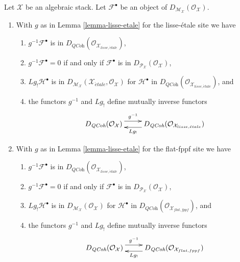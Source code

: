 \begin{lemma}
\label{lemma-derived-quasi-coherent}
Let $\mathcal{X}$ be an algebraic stack.
Let $\mathcal{F}^\bullet$ be an object of
$D_{\mathcal{M}_\mathcal{X}}(\mathcal{O}_\mathcal{X})$.
\begin{enumerate}
\item With $g$ as in Lemma \ref{lemma-lisse-etale}
for the lisse-\'etale site we have
\begin{enumerate}
\item $g^{-1}\mathcal{F}^\bullet$ is in
$D_{\textit{QCoh}}(\mathcal{O}_{\mathcal{X}_{lisse,\acute{e}tale}})$,
\item $g^{-1}\mathcal{F}^\bullet = 0$ if and only if
$\mathcal{F}^\bullet$ is in
$D_{\mathcal{P}_\mathcal{X}}(\mathcal{O}_\mathcal{X})$,
\item $Lg_!\mathcal{H}^\bullet$ is in
$D_{\mathcal{M}_\mathcal{X}}(
\mathcal{X}_{\acute{e}tale}, \mathcal{O}_\mathcal{X})$
for $\mathcal{H}^\bullet$ in
$D_{\textit{QCoh}}(\mathcal{O}_{\mathcal{X}_{lisse,\acute{e}tale}})$, and
\item the functors $g^{-1}$ and $Lg_!$ define mutually inverse functors
$$
\xymatrix{
D_{\textit{QCoh}}(\mathcal{O}_\mathcal{X}) \ar@<1ex>[r]^-{g^{-1}} &
D_{\textit{QCoh}}(\mathcal{O}_{\mathcal{X}_{lisse,\acute{e}tale}})
\ar@<1ex>[l]^-{Lg_!}
}
$$
\end{enumerate}
\item With $g$ as in Lemma \ref{lemma-lisse-etale}
for the flat-fppf site we have
\begin{enumerate}
\item $g^{-1}\mathcal{F}^\bullet$ is in
$D_{\textit{QCoh}}(\mathcal{O}_{\mathcal{X}_{lisse,\acute{e}tale}})$,
\item $g^{-1}\mathcal{F}^\bullet = 0$ if and only if
$\mathcal{F}^\bullet$ is in
$D_{\mathcal{P}_\mathcal{X}}(\mathcal{O}_\mathcal{X})$,
\item $Lg_!\mathcal{H}^\bullet$ is in
$D_{\mathcal{M}_\mathcal{X}}(\mathcal{O}_\mathcal{X})$
for $\mathcal{H}^\bullet$ in
$D_{\textit{QCoh}}(\mathcal{O}_{\mathcal{X}_{flat,fppf}})$, and
\item the functors $g^{-1}$ and $Lg_!$ define mutually inverse functors
$$
\xymatrix{
D_{\textit{QCoh}}(\mathcal{O}_\mathcal{X}) \ar@<1ex>[r]^-{g^{-1}} &
D_{\textit{QCoh}}(\mathcal{O}_{\mathcal{X}_{flat,fppf}}) \ar@<1ex>[l]^-{Lg_!}
}
$$
\end{enumerate}
\end{enumerate}
\end{lemma}

